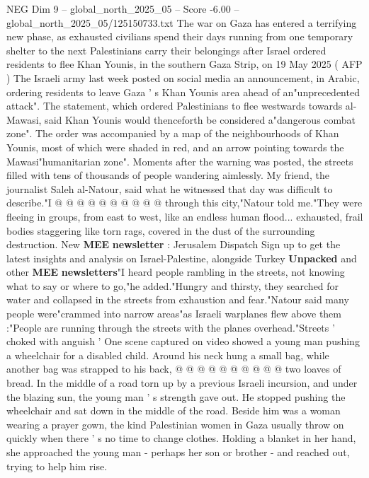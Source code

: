 \begin{textsample}{NEG Dim 9 – global\_north\_2025\_05 – Score -6.00 – global\_north\_2025\_05/125150733.txt}  \label{ex:f9_neg_090}
The war on Gaza has entered a terrifying new phase, as exhausted civilians spend their days running from one temporary shelter to the next Palestinians carry their belongings after Israel ordered residents to flee Khan Younis, in the southern Gaza Strip, on 19 May 2025 ( AFP ) The Israeli army last week posted on social media an announcement, in Arabic, ordering residents to leave Gaza ' s Khan Younis area ahead of an"unprecedented attack".
The statement, which ordered Palestinians to flee westwards towards al-Mawasi, said Khan Younis would thenceforth be considered a"dangerous combat zone".
The order was accompanied by a map of the neighbourhoods of Khan Younis, most of which were shaded in red, and an arrow pointing towards the Mawasi"humanitarian zone".
Moments after the warning was posted, the streets filled with tens of thousands of people wandering aimlessly.
My friend, the journalist Saleh al-Natour, said what he witnessed that day was difficult to describe."I @ @ @ @ @ @ @ @ @ @ through this city,"Natour told me."They were fleeing in groups, from east to west, like an endless human flood... exhausted, frail bodies staggering like torn rags, covered in the dust of the surrounding destruction.
New \textbf{MEE} \textbf{newsletter} : Jerusalem Dispatch Sign up to get the latest insights and analysis on Israel-Palestine, alongside Turkey \textbf{Unpacked} and other \textbf{MEE} \textbf{newsletters}"I heard people rambling in the streets, not knowing what to say or where to go,"he added."Hungry and thirsty, they searched for water and collapsed in the streets from exhaustion and fear."Natour said many people were"crammed into narrow areas"as Israeli warplanes flew above them :"People are running through the streets with the planes overhead."Streets ' choked with anguish ' One scene captured on video showed a young man pushing a wheelchair for a disabled child.
Around his neck hung a small bag, while another bag was strapped to his back, @ @ @ @ @ @ @ @ @ @ two loaves of bread.
In the middle of a road torn up by a previous Israeli incursion, and under the blazing sun, the young man ' s strength gave out.
He stopped pushing the wheelchair and sat down in the middle of the road.
Beside him was a woman wearing a prayer gown, the kind Palestinian women in Gaza usually throw on quickly when there ' s no time to change clothes.
Holding a blanket in her hand, she approached the young man - perhaps her son or brother - and reached out, trying to help him rise.

\end{textsample}
